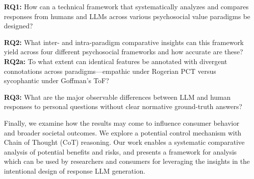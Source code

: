 \medskip\textbf{RQ1:} How can a technical framework that systematically analyzes and compares responses from humans and LLMs across various psychosocial value paradigms be designed?  

\medskip\textbf{RQ2:} What inter- and intra-paradigm comparative insights can this framework yield across four different psychosocial frameworks and how accurate are these?
\textbf{RQ2a:} To what extent can identical features be annotated with divergent connotations across paradigms—empathic under Rogerian PCT versus sycophantic under Goffman’s ToF?

\medskip\textbf{RQ3:} What are the major observable differences between LLM and human responses to personal questions without clear normative ground-truth answers?

Finally, we examine how the results may come to influence consumer behavior and broader societal outcomes. We explore a potential control mechanism with Chain of Thought (CoT) reasoning. Our work enables a systematic comparative analysis of potential benefits and risks, and presents a framework for analysis which can be used by researchers and consumers for leveraging the insights in the intentional design of response LLM generation.






